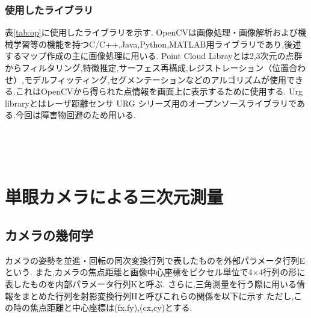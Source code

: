 \documentclass[12pt,oneside]{sotsuken_paper}
\begin{document}
\subsection{使用したライブラリ} 
表\ref{tab:op}に使用したライブラリを示す. OpenCVは画像処理・画像解析および機械学習等の機能を持つC/C++,Java,Python,MATLAB用ライブラリであり,後述するマップ作成の主に画像処理に用いる. Point Cloud Librayとは2,3次元の点群からフィルタリング,特徴推定,サーフェス再構成,レジストレーション（位置合わせ）,モデルフィッティング,セグメンテーションなどのアルゴリズムが使用できる.これはOpenCVから得られた点情報を画面上に表示するために使用する. Urg libraryとはレーザ距離センサ URG シリーズ用のオープンソースライブラリである.今回は障害物回避のため用いる. 
\begin{table}[h] 
 　\begin{center} 
    \caption{使用したライブラリ} 
    \small 
　   \label{tab:op} 
  \end{center} 
\end{table}

\chapter{単眼カメラによる三次元測量}
\section{カメラの幾何学}
カメラの姿勢を並進・回転の同次変換行列で表したものを外部パラメータ行列Eという.
また,カメラの焦点距離と画像中心座標をピクセル単位で4×4行列の形に表したものを内部パラメータ行列Kと呼ぶ.
さらに,三角測量を行う際に用いる情報をまとめた行列を射影変換行列Hと呼びこれらの関係を以下に示す.ただし,この時の焦点距離と中心座標は(fx,fy),(cx,cy)とする.
\end{document}

